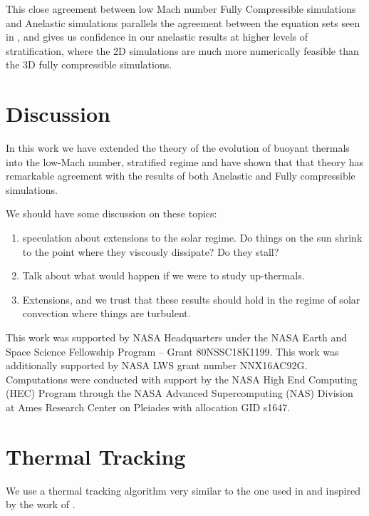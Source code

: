\documentclass[twocolumn, amsmath, amsfonts, amssymb, trackchanges]{aastex62}
\begin{document}
This close agreement between low Mach number Fully Compressible simulations and Anelastic
simulations parallels the agreement between the equation sets seen in \citet{lecoanet&all2014},
and gives us confidence in our anelastic results at higher levels of stratification, where
the 2D simulations are much more numerically feasible than the 3D fully compressible simulations.


\section{Discussion}
\label{sec:discussion}
In this work we have extended the theory of the evolution of buoyant thermals into the
low-Mach number, stratified regime and have shown that that theory has remarkable agreement
with the results of both Anelastic and Fully compressible simulations.

We should have some discussion on these topics:
\begin{enumerate}
\item speculation about extensions to the solar regime. Do things on the sun shrink
to the point where they viscously dissipate? Do they stall?
\item Talk about what would happen if we were to study up-thermals.
\item Extensions, and we trust that these results should hold in the regime of solar convection
where things are turbulent.
\end{enumerate}

\begin{acknowledgements}
This work was supported by NASA Headquarters under the NASA Earth and Space
Science Fellowship Program -- Grant 80NSSC18K1199.
This work was additionally supported by  NASA LWS grant number NNX16AC92G.  
Computations were conducted 
with support by the NASA High End Computing (HEC) Program through the NASA 
Advanced Supercomputing (NAS) Division at Ames Research Center on Pleiades
with allocation GID s1647.
\end{acknowledgements}

\appendix
\section{Thermal Tracking}
\label{appendix:tracking}
We use a thermal tracking algorithm very similar to the one used in 
\citet{lecoanet&jeevanjee2018} and inspired by the work of 
\citet{romps&all2015}. 
\end{document}
